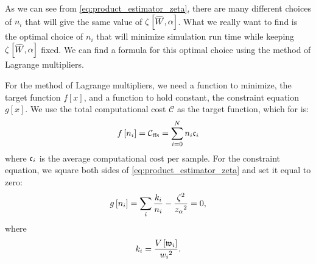 As we can see from \eqref{eq:product_estimator_zeta}, there are many different choices of $n_i$ that will give the same value of $\zeta \left[ \widehat{W}, \alpha \right]$. What we really want to find is the optimal choice of $n_i$ that will minimize simulation run time while keeping $\zeta \left[ \widehat{W}, \alpha \right]$ fixed. We can find a formula for this optimal choice using the method of Lagrange multipliers\supercite{Riley:2006wb}.

For the method of Lagrange multipliers, we need a function to minimize, the target function $f[x]$, and a function to hold constant, the constraint equation $g[x]$. We use the total computational cost $\mathcal{C}$ as the target function, which for  is:
    \begin{equation}
    \label{eq:cost_target_func}
        f\left[n_i\right] = {\mathcal{C}}_{\textrm{ffs}} = \sum _{i=0}^N n_i \mathfrak{c}_{i}
    \end{equation}
where $\mathfrak{c}_{i}$ is the average computational cost per sample. For the constraint equation, we square both sides of \eqref{eq:product_estimator_zeta} and set it equal to zero:
    \begin{equation}
    \label{eq:error_constraint_func}
    	g\left[n_i\right]=\sum_i \frac{k_i}{n_i}-\frac{\zeta {}^2}{z_{\alpha} {}^2}=0,
    \end{equation}
where
    \begin{equation*}
    	k_i=\frac{V \left[ \mathfrak{w}_{i} \right]}{w_{i} {}^2}.
    \end{equation*}

